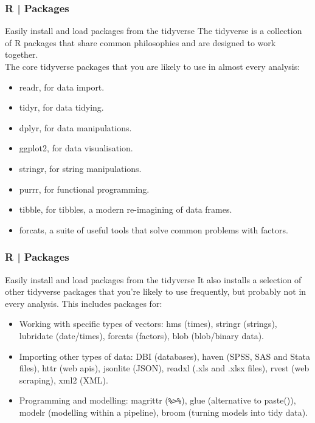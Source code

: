 \begin{frame}
  \frametitle{R | Packages}
  \begin{block}{Easily install and load packages from the tidyverse}
    The \alert{tidyverse} is a collection of R packages that share common philosophies and are designed to work together.\\
    \vspace{0.3em}
    The \alert{core tidyverse packages} that you are likely to use in almost every analysis:
    \begin{itemize}
      \item readr, for data import.
      \item tidyr, for data tidying.
      \item dplyr, for data manipulations.
      \item ggplot2, for data visualisation.
      \item stringr, for string manipulations.
      \item purrr, for functional programming.
      \item tibble, for tibbles, a modern re-imagining of data frames.
      \item forcats, a suite of useful tools that solve common problems with factors.
    \end{itemize}
  \end{block}
\end{frame}

\begin{frame}[fragile]
  \frametitle{R | Packages}
  \begin{block}{Easily install and load packages from the tidyverse}
    It also installs a selection of other tidyverse packages that you're likely to use frequently, but probably not in every analysis. This includes packages for:
    \begin{itemize}
      \item Working with specific types of vectors: hms (times), stringr (strings), lubridate (date/times), forcats (factors), blob (blob/binary data).
      \item Importing other types of data: DBI (databases), haven (SPSS, SAS and Stata files), httr (web apis), jsonlite (JSON), readxl (.xls and .xlsx files), rvest (web scraping), xml2 (XML).
      \item Programming and modelling: magrittr (\verb|%>%|), glue (alternative to paste()), modelr (modelling within a pipeline), broom (turning models into tidy data).
    \end{itemize}
  \end{block}
\end{frame}

